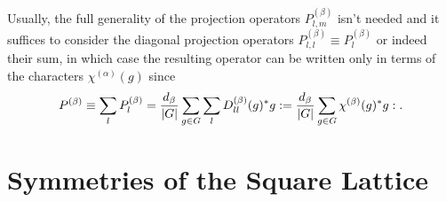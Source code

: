 Usually, the full generality of the
projection operators $P^{(\beta)}_{l,m}$ isn't needed and it suffices to consider the diagonal projection operators
$P^{(\beta)}_{l,l} \equiv P^{(\beta)}_l$ or indeed their sum, in which case the resulting operator can be written only in terms of the \irr characters
$\chi^{(\alpha)}(g)$ since
\begin{equation}
    \label{eq:Group:Irr:Pro:charPro}
    P^{(\beta)}\equiv\sum_lP^{(\beta)}_l = \frac{d_\beta}{\lvert G \rvert}\sum_{g\in G}\sum_lD_{ll}^{(\beta)}(g)^\ast g: = \frac{d_\beta}{\lvert G \rvert}\sum_{g\in G}\chi^{(\beta)}(g)^\ast g:.
\end{equation}


\section{Symmetries of the Square Lattice}
\label{sec:Group:Symm}

